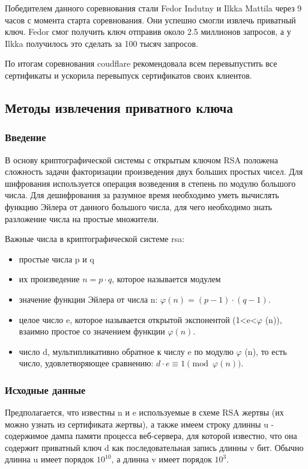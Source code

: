 \documentclass[20pt]{article}
\begin{document}
Победителем данного соревнования стали Fedor Indutny\cite{heartbleed/Indutny} и
Ilkka Mattila через 9 часов с момента старта соревнования. Они успешно смогли
извлечь приватный ключ. Fedor смог получить ключ отправив около 2.5 миллионов
запросов, а у Ilkka получилось это сделать за 100 тысяч запросов.

По итогам соревнования coudflare рекомендовала всем перевыпустить все сертификаты
и ускорила перевыпуск сертификатов своих клиентов.

\subsection{Методы извлечения приватного ключа \cite{playing-hide-and-seek-with-stored-keys} }

\subsubsection{Введение}
В основу криптографической системы с открытым ключом RSA положена сложность задачи
факторизации произведения двух больших простых чисел. Для шифрования используется
операция возведения в степень по модулю большого числа. Для дешифрования за
разумное время необходимо уметь вычислять функцию Эйлера от данного большого
числа, для чего необходимо знать разложение числа на простые множители.

Важные числа в криптографической системе rsa:
\begin{itemize}
  \item простые числа p и q
  \item их произведение $n=p \cdot q$, которое называется модулем
  \item значение функции Эйлера от числа n: $\varphi (n)=(p-1)\cdot (q-1)$.
  \item целое число e, которое называется открытой экспонентой
    (1<e<$\varphi$ (n)), взаимно простое со значением функции $\varphi(n)$.
  \item число d, мультипликативно обратное к числу e по модулю
    $\varphi$ (n), то есть число, удовлетворяющее сравнению: $d\cdot e\equiv 1{\pmod {\varphi (n)}}$.
\end{itemize}

\subsubsection{Исходные данные}
Предполагается, что известны n и e используемые в схеме RSA жертвы (их можно
узнать из сертификата жертвы), а также имеем строку длинны u - содержимое дампа
памяти процесса веб-сервера, для которой известно, что она содержит приватный
ключ d как последовательная запись длинны v бит. Обычно длинна u имеет порядок
$10^10$, а длинна v имеет порядок $10^3$.
\end{document}
